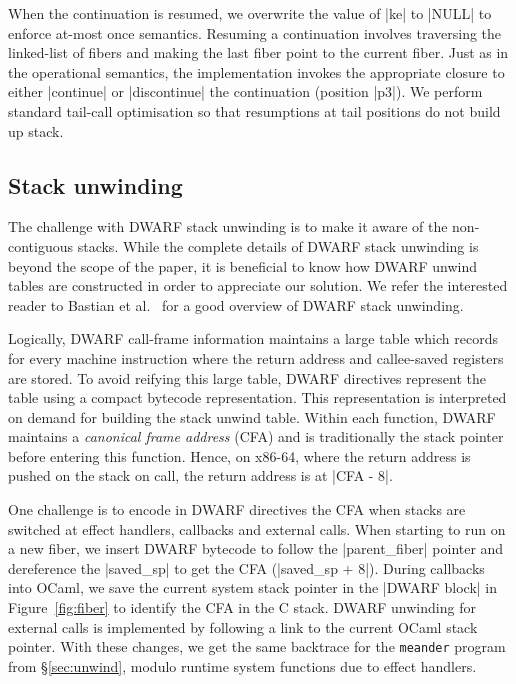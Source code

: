 \documentclass[sigplan,10pt,review,anonymous]{acmart}\settopmatter{printfolios=true,printccs=false,printacmref=false}
\begin{document}
When the continuation is resumed, we overwrite the value of |ke| to |NULL| to
enforce at-most once semantics. Resuming a continuation involves traversing the
linked-list of fibers and making the last fiber point to the current fiber.
Just as in the operational semantics, the implementation invokes the
appropriate closure to either |continue| or |discontinue| the continuation
(position |p3|). We perform standard tail-call optimisation so that resumptions
at tail positions do not build up stack.

\vspace{-2mm}
\subsection{Stack unwinding}

The challenge with DWARF stack unwinding is to make it aware of the
non-contiguous stacks. While the complete details of DWARF stack unwinding is
beyond the scope of the paper, it is beneficial to know how DWARF unwind tables
are constructed in order to appreciate our solution. We refer the interested
reader to Bastian et al.~\cite{Bastian19} for a good overview of DWARF stack
unwinding.

Logically, DWARF call-frame information maintains a large table which records
for every machine instruction where the return address and callee-saved
registers are stored. To avoid reifying this large table, DWARF directives
represent the table using a compact bytecode representation. This representation
is interpreted on demand for building the stack unwind table. Within each
function, DWARF maintains a \emph{canonical frame address} (CFA) and is
traditionally the stack pointer before entering this function. Hence, on x86-64,
where the return address is pushed on the stack on call, the return address is
at |CFA - 8|.

One challenge is to encode in DWARF directives the CFA when stacks are switched
at effect handlers, callbacks and external calls. When starting to run on a new
fiber, we insert DWARF bytecode to follow the |parent_fiber| pointer and
dereference the |saved_sp| to get the CFA (|saved_sp + 8|). During callbacks
into OCaml, we save the current system stack pointer in the |DWARF block| in
Figure~\ref{fig:fiber} to identify the CFA in the C stack. DWARF unwinding for
external calls is implemented by following a link to the current OCaml stack
pointer. With these changes, we get the same backtrace for the \texttt{meander}
program from \S\ref{sec:unwind}, modulo runtime system functions due to effect
handlers.
\end{document}
